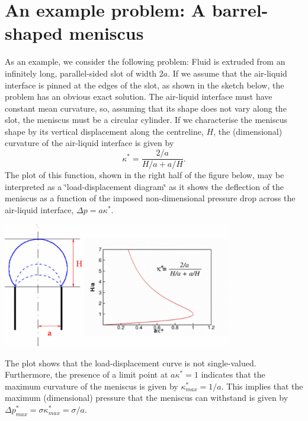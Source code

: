 

\hypertarget{index_barrel}{}\section{An example problem\+: A barrel-\/shaped meniscus}\label{index_barrel}
As an example, we consider the following problem\+: Fluid is extruded from an infinitely long, parallel-\/sided slot of width $ 2a $. If we assume that the air-\/liquid interface is pinned at the edges of the slot, as shown in the sketch below, the problem has an obvious exact solution. The air-\/liquid interface must have constant mean curvature, so, assuming that its shape does not vary along the slot, the meniscus must be a circular cylinder. If we characterise the meniscus\textquotesingle{} shape by its vertical displacement along the centreline, $ H $, the (dimensional) curvature of the air-\/liquid interface is given by \[ \kappa^* = \frac{2/a}{H/a + a/H}. \] The plot of this function, shown in the right half of the figure below, may be interpreted as a \char`\"{}load-\/displacement
diagram\char`\"{} as it shows the deflection of the meniscus as a function of the imposed non-\/dimensional pressure drop across the air-\/liquid interface, $ \Delta p = a \kappa^*. $

 
\begin{DoxyImage}
\includegraphics[width=0.75\textwidth]{meniscus_sketch_and_limit_point}
\end{DoxyImage}


The plot shows that the load-\/displacement curve is not single-\/valued. Furthermore, the presence of a limit point at $ a \kappa^* = 1 $ indicates that the maximum curvature of the meniscus is given by $ \kappa_{max}^* = 1/a. $ This implies that the maximum (dimensional) pressure that the meniscus can withstand is given by $ \Delta p^*_{max} = \sigma \kappa_{max}^* = \sigma/a $.

